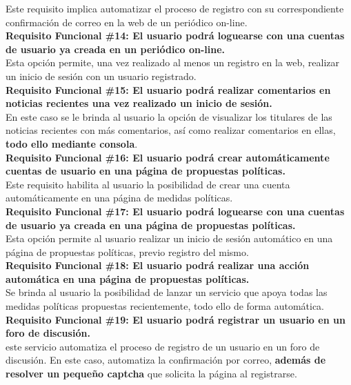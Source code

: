 \begin{adjustwidth}{0.5cm}{}
	Este requisito implica automatizar el proceso de registro con su correspondiente confirmación de correo en la web de un periódico on-line. \\
	\linebreak
	\textbf{Requisito Funcional \#14: El usuario podrá loguearse con una cuentas de usuario ya creada en un periódico on-line.}\\
	Esta opción permite, una vez realizado al menos un registro en la web, realizar un inicio de sesión con un usuario registrado. \\
	\linebreak				
	\textbf{Requisito Funcional \#15: El usuario podrá realizar comentarios en noticias recientes una vez realizado un inicio de sesión.}\\
	En este caso se le brinda al usuario la opción de visualizar los titulares de las noticias recientes con más comentarios, así como realizar comentarios en ellas, \textbf{todo ello mediante consola}. \\
	\linebreak			
	\textbf{Requisito Funcional \#16: El usuario podrá crear automáticamente cuentas de usuario en una página de propuestas políticas.}\\
	Este requisito habilita al usuario la posibilidad de crear una cuenta automáticamente en una página de medidas políticas. \\
	\linebreak	
	\textbf{Requisito Funcional \#17: El usuario podrá loguearse con una cuentas de usuario ya creada en una página de propuestas políticas.}\\
	Esta opción permite al usuario realizar un inicio de sesión automático en una página de propuestas políticas, previo registro del mismo. \\
	\linebreak				
	\textbf{Requisito Funcional \#18: El usuario podrá realizar una acción automática en una página de propuestas políticas.}\\
	Se brinda al usuario la posibilidad de lanzar un servicio que apoya todas las medidas políticas propuestas recientemente, todo ello de forma automática.\\			
	\linebreak		
	\textbf{Requisito Funcional \#19: El usuario podrá registrar un usuario en un foro de discusión.}\\
	este servicio automatiza el proceso de registro de un usuario en un foro de discusión. En este caso, automatiza la confirmación por correo, \textbf{además de resolver un pequeño captcha} que solicita la página al registrarse. \\

\end{adjustwidth}
